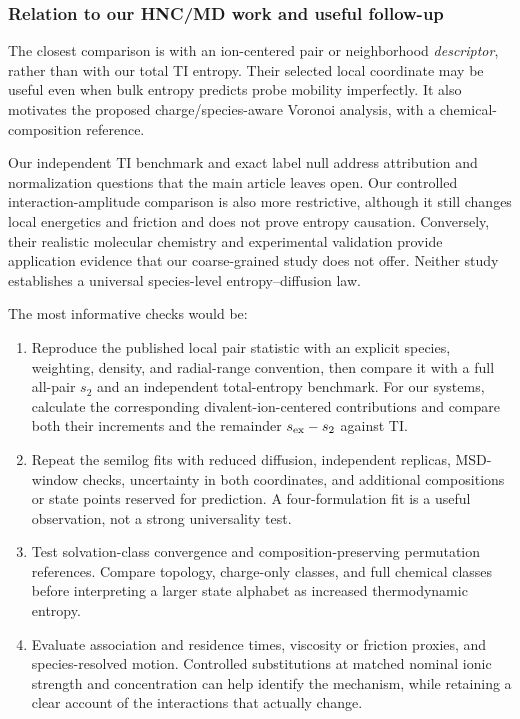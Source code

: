 \documentclass[11pt,a4paper]{article}
\begin{document}
\subsubsection{Relation to our HNC/MD work and useful follow-up}
The closest comparison is with an ion-centered pair or neighborhood
\emph{descriptor}, rather than with our total TI entropy. Their selected
local coordinate may be useful even when bulk entropy predicts probe
mobility imperfectly. It also motivates the proposed charge/species-aware
Voronoi analysis, with a chemical-composition reference.

Our independent TI benchmark and exact label null address attribution and
normalization questions that the main article leaves open. Our controlled
interaction-amplitude comparison is also more restrictive, although it still
changes local energetics and friction and does not prove entropy causation.
Conversely, their realistic molecular chemistry and experimental validation
provide application evidence that our coarse-grained study does not offer.
Neither study establishes a universal species-level entropy--diffusion law.

The most informative checks would be:
\begin{enumerate}
\item Reproduce the published local pair statistic with an explicit species,
weighting, density, and radial-range convention, then compare it with a full
all-pair $s_2$ and an independent total-entropy benchmark. For our systems,
calculate the corresponding divalent-ion-centered contributions and compare
both their increments and the remainder $s_{\rm ex}-s_2$ against TI.
\item Repeat the semilog fits with reduced diffusion, independent replicas,
MSD-window checks, uncertainty in both coordinates, and additional compositions
or state points reserved for prediction. A four-formulation fit is a useful
observation, not a strong universality test.
\item Test solvation-class convergence and composition-preserving permutation
references. Compare topology, charge-only classes, and full chemical classes
before interpreting a larger state alphabet as increased thermodynamic entropy.
\item Evaluate association and residence times, viscosity or friction proxies,
and species-resolved motion. Controlled substitutions at matched nominal
ionic strength and concentration can help identify the mechanism, while
retaining a clear account of the interactions that actually change.
\end{enumerate}
\end{document}
